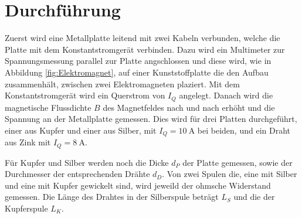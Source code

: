 \section{Durchführung}
\label{sec:Durchführung}

Zuerst wird eine Metallplatte leitend mit zwei Kabeln verbunden, welche die Platte mit dem Konstantstromgerät verbinden. 
Dazu wird ein Multimeter zur Spannungsmessung parallel zur Platte angschlossen und diese wird, wie in Abbildung \ref{fig:Elektromagnet}, auf einer Kunststoffplatte die den Aufbau zusammenhält, zwischen zwei Elektromagneten plaziert.
Mit dem Konstantstromgerät wird ein Querstrom von $I_Q$ angelegt.
Danach wird die magnetische Flussdichte $B$ des Magnetfeldes nach und nach erhöht und die Spannung an der Metallplatte gemessen.
Dies wird für drei Platten durchgeführt, einer aus Kupfer und einer aus Silber, mit $I_Q=\qty{10}{\ampere}$ bei beiden, und ein Draht aus Zink mit $I_Q=\qty{8}{\ampere}$.

Für Kupfer und Silber werden noch die Dicke $d_P$ der Platte gemessen, sowie der Durchmesser der entsprechenden Drähte $d_D$.
Von zwei Spulen die, eine mit Silber und eine mit Kupfer gewickelt sind, wird jeweild der ohmsche Widerstand gemessen.
Die Länge des Drahtes in der Silberspule beträgt $L_S$ und die der Kupferspule $L_K$.


